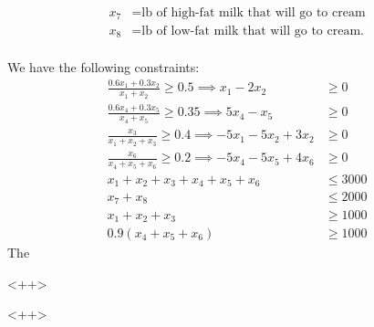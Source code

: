 \documentclass{article}
\begin{document}
\begin{enumerate}
\begin{align*}
			x_7 &= \text{lb of high-fat milk that will go to cream} \\
			x_8 &= \text{lb of low-fat milk that will go to cream.} \\
		\end{align*}
		\begin{soln}
			We have the following constraints:
			\begin{align*}
				\frac{0.6x_1+0.3x_2}{x_1+x_2} \ge 0.5 \implies x_1-2x_2 &\ge 0 \\
				\frac{0.6x_4+0.3x_5}{x_4+x_5} \ge 0.35 \implies 5x_4-x_5 &\ge 0 \\
				\frac{x_3}{x_1+x_2+x_3} \ge 0.4 \implies -5x_1-5x_2+3x_2 &\ge 0 \\
				\frac{x_6}{x_4+x_5+x_6} \ge 0.2 \implies -5x_4-5x_5+4x_6 &\ge 0 \\
				x_1+x_2+x_3+x_4+x_5+x_6 &\le 3000 \\
				x_7+x_8 &\le 2000 \\
				x_1+x_2+x_3 &\ge 1000 \\
				0.9(x_4+x_5+x_6) &\ge 1000
			\end{align*}
			The 
		\end{soln}<++>

\end{enumerate}<++>
\end{document}
